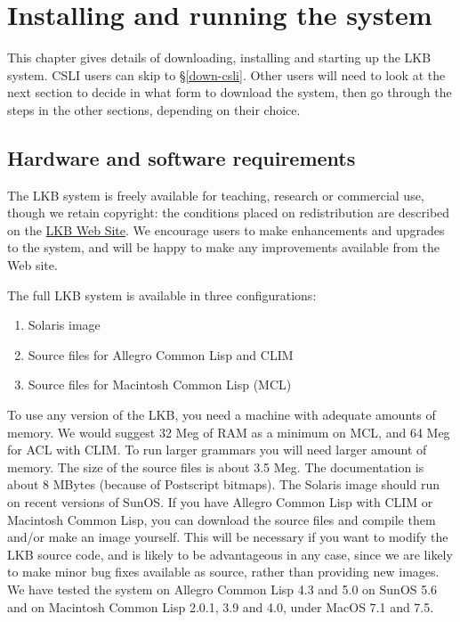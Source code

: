 \documentclass[12pt]{report}
\begin{document}
\chapter{Installing and running the system}
\label{installation}

This chapter gives details of downloading, installing and 
starting up the LKB system.
CSLI users can skip to \S\ref{down-csli}.
Other users will need to look at the next section to decide in
what form to download the system, then go through the steps in the
other sections, depending on their 
choice.

\section{Hardware and software requirements}
\label{require}

The LKB system is freely available for teaching, research or commercial use,
though we retain copyright:
the conditions placed on redistribution are described on the 
\href{http://www-csli.stanford.edu/~aac/lkb.html}{LKB Web Site}.
We encourage users to make enhancements and upgrades to the system,
and will be happy to make any improvements available from the Web site.

The full LKB system is available in three configurations:
\begin{enumerate}
\item Solaris image
\item Source files for Allegro Common Lisp and CLIM
\item Source files for Macintosh Common Lisp (MCL)
\end{enumerate}
To use any version of the LKB, you need a machine with adequate amounts of memory.
We would suggest 32 Meg of RAM as a minimum on MCL, 
and 64 Meg for ACL with CLIM.
To run larger grammars
you will need larger amount of memory.  The size of the source
files is about 3.5 Meg.  The documentation is about 8 MBytes
(because of Postscript bitmaps).
The Solaris image should run on recent versions of SunOS.
If you have Allegro Common Lisp with CLIM or Macintosh Common Lisp, you 
can download the source files
and compile them and/or make an image yourself.  This will be necessary
if you want to modify the LKB source code, and is likely to be
advantageous in any case, since we are likely to make minor bug fixes available
as source, rather than providing new images.
We have tested the system on Allegro Common Lisp 4.3 and 5.0 on SunOS 5.6
and on 
Macintosh Common Lisp 2.0.1, 3.9 and 4.0, under MacOS 7.1 and 7.5.
\end{document}
